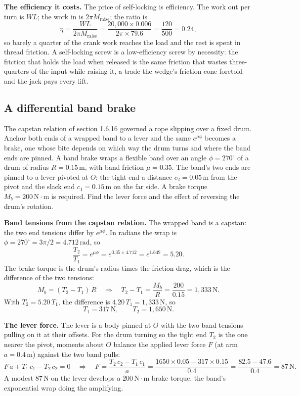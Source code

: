 \textbf{The efficiency it costs.} The price of self-locking is efficiency. The
work out per turn is $W L$; the work in is $2\pi M_{\text{raise}}$; the ratio
is
\[
\eta = \frac{W L}{2\pi M_{\text{raise}}}
= \frac{20{,}000 \times 0.006}{2\pi \times 79.6} = \frac{120}{500} = 0.24,
\]
so barely a quarter of the crank work reaches the load and the rest is spent in
thread friction. A self-locking screw is a low-efficiency screw by necessity:
the friction that holds the load when released is the same friction that wastes
three-quarters of the input while raising it, a trade the wedge's friction cone
foretold and the jack pays every lift.

\subsection{A differential band brake}

The capstan relation of section 1.6.16 governed a rope slipping over a fixed
drum. Anchor both ends of a wrapped band to a lever and the same $e^{\mu\phi}$
becomes a brake, one whose bite depends on which way the drum turns and where
the band ends are pinned. A band brake wraps a flexible band over an angle
$\phi = 270^{\circ}$ of a drum of radius $R = 0.15\,\si{\meter}$, with band
friction $\mu = 0.35$. The band's two ends are pinned to a lever pivoted at
$O$: the tight end a distance $c_2 = 0.05\,\si{\meter}$ from the pivot and the
slack end $c_1 = 0.15\,\si{\meter}$ on the far side. A brake torque $M_b =
200\,\text{N}\cdot\text{m}$ is required. Find the lever force and the effect of
reversing the drum's rotation.

\textbf{Band tensions from the capstan relation.} The wrapped band is a
capstan: the two end tensions differ by $e^{\mu\phi}$. In radians the wrap is
$\phi = 270^{\circ} = 3\pi/2 = 4.712\,\text{rad}$, so
\[
\frac{T_2}{T_1} = e^{\mu\phi} = e^{0.35 \times 4.712} = e^{1.649} = 5.20.
\]
The brake torque is the drum's radius times the friction drag, which is the
difference of the two tensions:
\[
M_b = (T_2 - T_1)\,R
\quad\Longrightarrow\quad
T_2 - T_1 = \frac{M_b}{R} = \frac{200}{0.15} = 1{,}333\,\text{N}.
\]
With $T_2 = 5.20\,T_1$, the difference is $4.20\,T_1 = 1{,}333\,\text{N}$, so
\[
T_1 = 317\,\text{N}, \qquad T_2 = 1{,}650\,\text{N}.
\]

\textbf{The lever force.} The lever is a body pinned at $O$ with the two band
tensions pulling on it at their offsets. For the drum turning so the tight end
$T_2$ is the one nearer the pivot, moments about $O$ balance the applied lever
force $F$ (at arm $a = 0.4\,\si{\meter}$) against the two band pulls:
\[
F\,a + T_1\,c_1 - T_2\,c_2 = 0
\quad\Longrightarrow\quad
F = \frac{T_2\,c_2 - T_1\,c_1}{a}
= \frac{1650 \times 0.05 - 317 \times 0.15}{0.4}
= \frac{82.5 - 47.6}{0.4} = 87\,\text{N}.
\]
A modest $87\,\text{N}$ on the lever develops a $200\,\text{N}\cdot\text{m}$
brake torque, the band's exponential wrap doing the amplifying.

